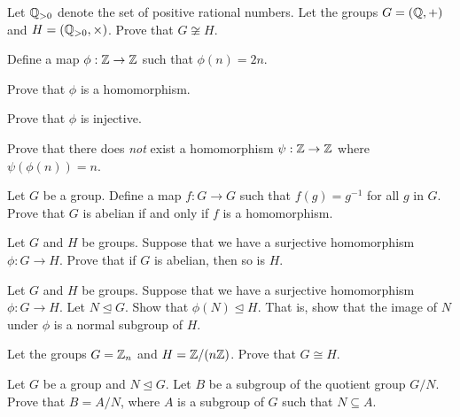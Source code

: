 \begin{problem}
    Let $\mathbb{Q}_{>0}$ denote the set of positive rational numbers. Let the groups $G = (\mathbb{Q}, +)$ and $H = (\mathbb{Q}_{>0}, \times)$. Prove that $G \not\cong H$.
\end{problem}

\begin{problem}
    Define a map $\phi: \mathbb{Z} \to \mathbb{Z}$ such that $\phi(n) = 2n$.
    \begin{partquestions}{\alph*}
        \item Prove that $\phi$ is a homomorphism.
        \item Prove that $\phi$ is injective.
        \item Prove that there does \textit{not} exist a homomorphism $\psi: \mathbb{Z} \to \mathbb{Z}$ where $\psi(\phi(n)) = n$.
    \end{partquestions}
\end{problem}

\begin{problem}
    Let $G$ be a group. Define a map $f: G \to G$ such that $f(g) = g^{-1}$ for all $g$ in $G$. Prove that $G$ is abelian if and only if $f$ is a homomorphism.
\end{problem}

\begin{problem}
    Let $G$ and $H$ be groups. Suppose that we have a surjective homomorphism $\phi: G \to H$. Prove that if $G$ is abelian, then so is $H$.
\end{problem}

\begin{problem}
    Let $G$ and $H$ be groups. Suppose that we have a surjective homomorphism $\phi: G \to H$. Let $N \unlhd G$. Show that $\phi(N) \unlhd H$. That is, show that the image of $N$ under $\phi$ is a normal subgroup of $H$.
\end{problem}

\begin{problem}\label{problem-Zn-isomorphic-to-Z-by-nZ}
    Let the groups $G = \mathbb{Z}_n$ and $H = \mathbb{Z}/(n\mathbb{Z})$. Prove that $G \cong H$.
\end{problem}

\begin{problem}\label{problem-subgroup-of-quotient-group-is-quotient-group}
    Let $G$ be a group and $N \unlhd G$. Let $B$ be a subgroup of the quotient group $G/N$. Prove that $B = A/N$, where $A$ is a subgroup of $G$ such that $N \subseteq A$.
\end{problem}
